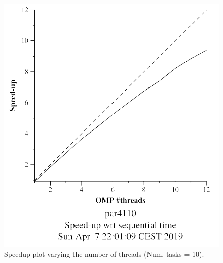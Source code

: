 \documentclass[12pt, a4paper]{article}
\begin{document}
\begin{figure}[H]
\begin{minipage}[b]{0.4\linewidth}
  \includegraphics[scale=0.5]{./mandel-omp-10000-strong-omp-24-10-speedup}
  \caption{Speedup plot varying the number of threads (Num. tasks = 10).}
  \label{fig:mandel-omp-10000-strong-omp-24-10-speedup}
\end{minipage}
\end{figure}
\end{document}
